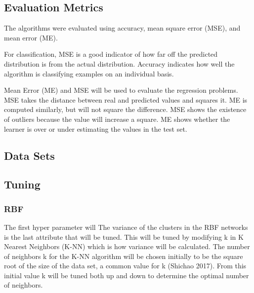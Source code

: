 \documentclass[twoside,11pt]{article}
\begin{document}
\subsection{Evaluation Metrics}
The algorithms were evaluated using accuracy, mean square error (MSE), and mean error (ME).

For classification, MSE is a good indicator of how far off the predicted distribution is from the actual distribution. Accuracy indicates how well the algorithm is classifying examples on an individual basis.

Mean Error (ME) and MSE will be used to evaluate the regression problems. MSE takes the distance between real and predicted values and squares it. ME is computed similarly, but will not square the difference. MSE shows the existence of outliers because the value will increase a square. ME shows whether the learner is over or under estimating the values in the test set.
\subsection{Data Sets}
\subsection{Tuning}
\subsubsection{RBF}
The first hyper parameter will 
The variance of the clusters in the RBF networks is the last attribute that will be tuned. This will be tuned by modifying k in K Nearest Neighbors (K-NN) which is how variance will be calculated. The number of  neighbors k for the K-NN algorithm will be chosen initially to be the square root of the size of the data set, a common value for k (Shichao 2017). From this initial value k will be tuned both up and down to determine the optimal number of neighbors.
\end{document}
